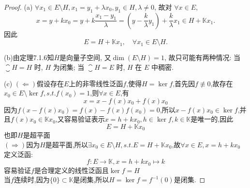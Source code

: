 \begin{proof}
    (a) $\forall x_1\in E\setminus H,x_1=y_1+\lambda x_0,y_1\in H,\lambda\neq0$, 故对 $\forall x\in E$,
    \[x=y+kx_0=y+k\frac{x_1-y_1}{\lambda}=\left(y-\frac{k}{\lambda}y_1\right)+\frac{k}{\lambda}x_1\in H+\mathbb{K}x_1.\]
    因此
    \[E=H+\mathbb{K}x_1,\quad\forall x_1\in E\setminus H.\]

    (b)由定理7.1.6知$\overline{H}$是向量子空间, 又$\dim (E\setminus H)=1$, 故只可能有两种情况:
    当 $\closure{H}=H$ 时, $H$ 为闭集; 当 $\closure{H}=E$ 时, $H$ 在 $E$ 中稠密.

    (c) $(\Leftarrow)$假设存在$E$上的非零线性泛函$f$,使得$H=\ker f$,首先因$f\not\equiv0$,故存在$x_0\in E\setminus\ker f,s.t.f(x_0)=1$,则$\forall x\in E$,有
    \[x=x-f(x)x_0+f(x)x_0\]
    因为$f(x-f(x)x_0)=f(x)-f(x)f(x_0)=0$,所以$x-f(x)x_0\in\ker f$,并且$f(x)x_0\in\mathbb{K}x_0$,又容易验证表示$x=h+kx_0,h\in\ker f,k\in\mathbb{K}$是唯一的,因此
    \[E=H+\mathbb{K}x_0\]也即$H$是超平面\\
    $(\Rightarrow)$因为$H$是超平面,所以$\exists x_0\in E\setminus H,s.t.E=H+\mathbb{K}x_0$,故$\forall x\in E,x=h+kx_0$\\
    定义泛函:\[f:E\to\mathbb{K},x=h+kx_0\mapsto k\]
    容易验证$f$是合理定义的线性泛函且$\ker f=H$\\
    当$f$连续时,因为$\{0\}\subset\mathbb{K}$是闭集,所以$H=\ker f=f^{-1}(0)$是闭集.
\end{proof}
